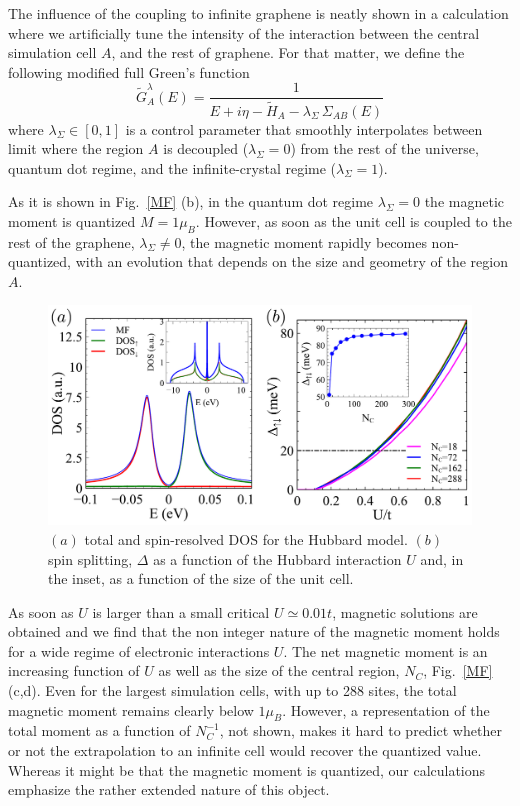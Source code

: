 The influence of the coupling to infinite graphene is neatly shown in a calculation where we artificially tune the intensity of the interaction between the central simulation cell $A$, and the rest of graphene.
For that matter, we define the following modified full Green's function
\begin{equation}
  \widetilde{G}_{A}^\lambda(E) =
  \frac{1}{E+i\eta-\widetilde{H}_{A}-\lambda_\Sigma\,\Sigma_{AB}(E)}
\end{equation}
where $\lambda_\Sigma\in[0,1]$ is a control parameter that smoothly interpolates
between limit where the region $A$ is decoupled ($\lambda_\Sigma = 0$) from the rest of the universe, quantum dot regime, and the infinite-crystal regime
($\lambda_\Sigma = 1$).

As it is shown in Fig.~\ref{MF} (b), in the quantum dot regime $\lambda_\Sigma = 0$ the magnetic moment is quantized $M=1\mu_B$. However, as soon as the unit cell is coupled to the rest of the graphene, $\lambda_\Sigma \ne 0$, the magnetic moment rapidly becomes non-quantized, with an evolution that depends on the size and geometry of the region $A$.
\begin{figure}[h!]
\centering
\includegraphics{defects/fig/MFfig2_dos.pdf}
\vspace{-15pt}
\caption{$(a)$ total and spin-resolved DOS for the Hubbard model. $(b)$ spin splitting, $\Delta$ as a function of the Hubbard interaction $U$ and, in the inset, as a function of the size of the unit cell.}
\label{MFdos}
\end{figure}
As soon as $U$ is larger than a small critical $U\simeq 0.01 t$, magnetic solutions are obtained and we find that the non integer nature of the magnetic moment holds for a wide regime of electronic interactions $U$.
The net magnetic moment is an increasing function of $U$ as well as the size of the central region, $N_C$, Fig.~\ref{MF} (c,d). Even for the largest simulation cells, with up to 288 sites, the total magnetic moment remains clearly below $1\mu_B$. However, a representation of the total moment as a function of $N_C^{-1}$, not shown, makes it hard to predict whether or not the extrapolation to an infinite cell would recover the quantized value. Whereas it might be that the magnetic moment is quantized, our calculations emphasize the rather extended nature of this object.

